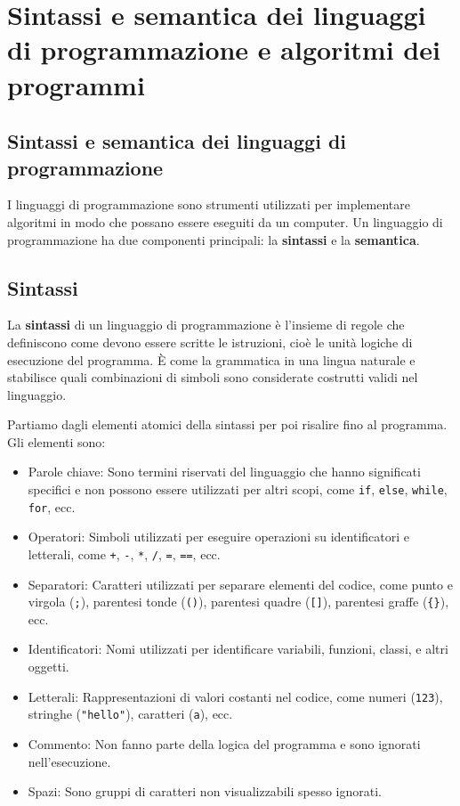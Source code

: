 \documentclass[
  letterpaper,
]{scrbook}
\providecommand{\tightlist}{%
  \setlength{\itemsep}{0pt}\setlength{\parskip}{0pt}}\usepackage{longtable,booktabs,array}
\begin{document}
\chapter{Sintassi e semantica dei linguaggi di programmazione e
algoritmi dei
programmi}\label{sintassi-e-semantica-dei-linguaggi-di-programmazione-e-algoritmi-dei-programmi}

\section{Sintassi e semantica dei linguaggi di
programmazione}\label{sintassi-e-semantica-dei-linguaggi-di-programmazione}

I linguaggi di programmazione sono strumenti utilizzati per implementare
algoritmi in modo che possano essere eseguiti da un computer. Un
linguaggio di programmazione ha due componenti principali: la
\textbf{sintassi} e la \textbf{semantica}.

\section{Sintassi}\label{sintassi}

La \textbf{sintassi} di un linguaggio di programmazione è l'insieme di
regole che definiscono come devono essere scritte le istruzioni, cioè le
unità logiche di esecuzione del programma. È come la grammatica in una
lingua naturale e stabilisce quali combinazioni di simboli sono
considerate costrutti validi nel linguaggio.

Partiamo dagli elementi atomici della sintassi per poi risalire fino al
programma. Gli elementi sono:

\begin{itemize}
\tightlist
\item
  Parole chiave: Sono termini riservati del linguaggio che hanno
  significati specifici e non possono essere utilizzati per altri scopi,
  come \texttt{if}, \texttt{else}, \texttt{while}, \texttt{for}, ecc.
\item
  Operatori: Simboli utilizzati per eseguire operazioni su
  identificatori e letterali, come \texttt{+}, \texttt{-}, \texttt{*},
  \texttt{/}, \texttt{=}, \texttt{==}, ecc.
\item
  Separatori: Caratteri utilizzati per separare elementi del codice,
  come punto e virgola (\texttt{;}), parentesi tonde (\texttt{()}),
  parentesi quadre (\texttt{{[}{]}}), parentesi graffe (\texttt{\{\}}),
  ecc.
\item
  Identificatori: Nomi utilizzati per identificare variabili, funzioni,
  classi, e altri oggetti.
\item
  Letterali: Rappresentazioni di valori costanti nel codice, come numeri
  (\texttt{123}), stringhe (\texttt{"hello"}), caratteri
  (\texttt{\textquotesingle{}a\textquotesingle{}}), ecc.
\item
  Commento: Non fanno parte della logica del programma e sono ignorati
  nell'esecuzione.
\item
  Spazi: Sono gruppi di caratteri non visualizzabili spesso ignorati.
\end{itemize}
\end{document}
